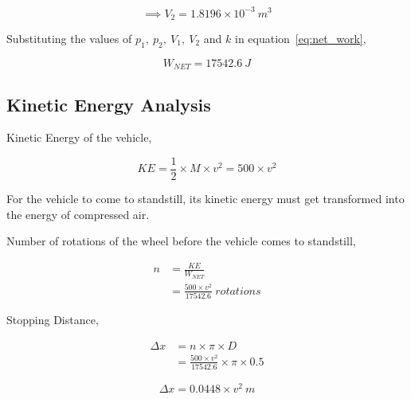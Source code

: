 \documentclass[12pt,a4paper]{article}
\begin{document}
		\begin{equation*}
			\implies V_2 = 1.8196 \times 10^{-3} \ m^3
		\end{equation*}

		Substituting the values of \( p_1, \ p_2, \ V_1, \ V_2 \) and \( k \) in equation~\ref{eq:net_work},

		\begin{equation*}
			\boxed{W_{NET} = 17542.6 \ J}
		\end{equation*}

	\subsection{Kinetic Energy Analysis}
		Kinetic Energy of the vehicle,

		\begin{equation} \label{eq:kinetic_energy}
			KE = \frac{1}{2} \times M \times v^2 = 500 \times v^2
		\end{equation}


		For the vehicle to come to standstill, its kinetic energy must get transformed into the energy of compressed air.

		Number of rotations of the wheel before the vehicle comes to standstill,

		\begin{align*} \label{eq:no_of_rotations}
			n &= \frac{KE}{W_{NET}} \\
			  &= \frac{500 \times v^2}{17542.6} \ rotations
		\end{align*}


		Stopping Distance,

		\begin{align*}
			\Delta x &= n \times \pi \times D \\
					 &= \frac{500 \times v^2}{17542.6} \times \pi \times 0.5
		\end{align*}

		\begin{equation} \label{eq:stopping_distance}
			\boxed{\Delta x = 0.0448 \times v^2 \ m}
		\end{equation}

\end{document}

